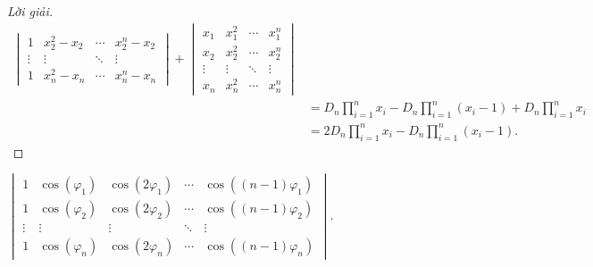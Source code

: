\begin{proof}[Lời giải]
\begin{align*}
\begin{vmatrix}
            1      & x_{2}^{2} - x_{2} & \cdots & x_{2}^{n} - x_{2} \\
            \vdots & \vdots            & \ddots & \vdots            \\
            1      & x_{n}^{2} - x_{n} & \cdots & x_{n}^{n} - x_{n}
        \end{vmatrix}
        +
        \begin{vmatrix}
            x_{1}  & x_{1}^{2} & \cdots & x_{1}^{n} \\
            x_{2}  & x_{2}^{2} & \cdots & x_{2}^{n} \\
            \vdots & \vdots    & \ddots & \vdots    \\
            x_{n}  & x_{n}^{2} & \cdots & x_{n}^{n}
        \end{vmatrix}                                                      \\
         & = D_{n}\prod^{n}_{i=1}x_{i} - D_{n}\prod^{n}_{i=1}(x_{i} - 1) + D_{n}\prod^{n}_{i=1}x_{i} \\
         & = 2D_{n}\prod^{n}_{i=1}x_{i} - D_{n}\prod^{n}_{i=1}(x_{i} - 1).
    \end{align*}
    \endgroup{}
\end{proof}

\begin{exercise}
    $\begin{vmatrix}
            1      & \cos(\varphi_{1}) & \cos(2\varphi_{1}) & \cdots & \cos((n-1)\varphi_{1}) \\
            1      & \cos(\varphi_{2}) & \cos(2\varphi_{2}) & \cdots & \cos((n-1)\varphi_{2}) \\
            \vdots & \vdots            & \vdots             & \ddots & \vdots                 \\
            1      & \cos(\varphi_{n}) & \cos(2\varphi_{n}) & \cdots & \cos((n-1)\varphi_{n})
        \end{vmatrix}$.
\end{exercise}


